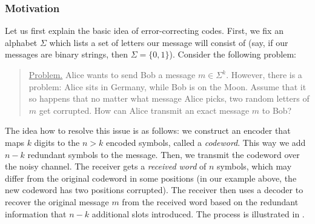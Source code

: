 \documentclass[../../book]{subfiles}
\begin{document}
\subsubsection{Motivation}

Let us first explain the basic idea of error-correcting codes.
First, we fix an alphabet $\Sigma$ which lists a set of letters our message will consist of (say, if our messages are binary strings, then $\Sigma = \{0,1\}$).
Consider the following problem:
\begin{quote}
    \underline{Problem.} Alice wants to send Bob a message $m \in \Sigma^k$. 
    However, there is a problem: Alice sits in Germany, while Bob is on the Moon.
    Assume that it so happens that no matter what message Alice picks, two random letters of $m$ get corrupted.
    How can Alice transmit an exact message $m$ to Bob?
\end{quote}

The idea how to resolve this issue is as follows: we construct an encoder that maps $k$ digits to the $n>k$ encoded symbols, called a \emph{codeword}. 
This way we add $n-k$ redundant symbols to the message. 
Then, we transmit the codeword over the noisy channel.
The receiver gets a \emph{received word} of $n$ symbols, which may differ from the original codeword in some positions (in our example above, the new codeword has two positions corrupted). 
The receiver then uses a decoder to recover the original message $m$ from the received word based on the redundant information that $n-k$ additional slots introduced.
The process is illustrated in .
\end{document}
